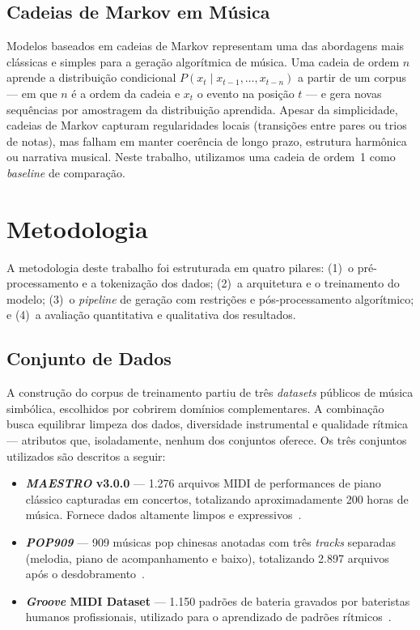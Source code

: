 \documentclass[12pt]{article}
\begin{document}
\subsection{Cadeias de Markov em Música}

Modelos baseados em cadeias de Markov representam uma das abordagens mais
clássicas e simples para a geração algorítmica de música. Uma cadeia de ordem $n$
aprende a distribuição condicional $P(x_t \mid x_{t-1}, \ldots, x_{t-n})$ a partir
de um corpus --- em que $n$ é a ordem da cadeia e $x_t$ o evento na posição $t$
--- e gera novas sequências por amostragem da distribuição aprendida. Apesar da
simplicidade, cadeias de Markov capturam regularidades locais (transições entre
pares ou trios de notas), mas falham em manter coerência de longo prazo, estrutura
harmônica ou narrativa musical. Neste trabalho, utilizamos uma cadeia de ordem~1
como \emph{baseline} de comparação.

\section{Metodologia}

A metodologia deste trabalho foi estruturada em quatro pilares:
(1)~o pré-processamento e a tokenização dos dados; (2)~a arquitetura e o
treinamento do modelo; (3)~o \emph{pipeline} de geração com restrições e
pós-processamento algorítmico; e (4)~a avaliação quantitativa e qualitativa dos
resultados.

\subsection{Conjunto de Dados}

A construção do corpus de treinamento partiu de três \emph{datasets} públicos de
música simbólica, escolhidos por cobrirem domínios complementares. A combinação
busca equilibrar limpeza dos dados, diversidade instrumental e qualidade rítmica
--- atributos que, isoladamente, nenhum dos conjuntos oferece. Os três conjuntos
utilizados são descritos a seguir:

\begin{itemize}
  \item \textbf{\emph{MAESTRO} v3.0.0} --- 1.276 arquivos MIDI de performances de piano
    clássico capturadas em concertos, totalizando aproximadamente 200 horas de
    música. Fornece dados altamente limpos e expressivos~\cite{hawthorne2019}.
  \item \textbf{\emph{POP909}} --- 909 músicas pop chinesas anotadas com três
    \emph{tracks} separadas (melodia, piano de acompanhamento e baixo),
    totalizando 2.897 arquivos após o desdobramento~\cite{wang2020}.
  \item \textbf{\emph{Groove} MIDI Dataset} --- 1.150 padrões de bateria gravados por
    bateristas humanos profissionais, utilizado para o aprendizado de padrões
    rítmicos~\cite{gillick2019}.
\end{itemize}
\end{document}
